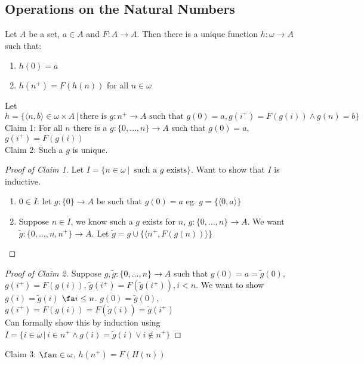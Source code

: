 
\subsection{Operations on the Natural Numbers}

\begin{theorem}
    Let $A$ be a set, $a \in A$ and $F : A \to A$. Then there is a unique function $h: \omega \to A$ such that: 
    \begin{enumerate}
        \item $h(0)=a$ 
        \item $h(n^+) = F(h(n))$ for all $n \in \omega$
    \end{enumerate}
\end{theorem}

\begin{pf}
    Let $h = \{ \langle n, b \rangle \in \omega \times A \, | \, \text{there is } g: n^+ \to A \text{ such that } g(0)=a, g(i^+)=F(g(i)) \wedge g(n)=b\}$ \\
    Claim 1: For all $n$ there is a $g : \{0, \ldots, n\} \to A$ such that $g(0)=a$, $g(i^+)=F(g(i))$ \\
    Claim 2: Such a $g$ is unique. 

\begin{proof}[Proof of Claim 1]
    Let $I = \{ n \in \omega \, | \, \text{ such a } g \text{ exists}\}$. Want to show that $I$ is inductive. 
    \begin{enumerate}
        \item $0 \in I$: let $g: \{0\} \to A$ be such that $g(0)=a$ eg. $g = \{ \langle 0, a \rangle \}$ 
        \item Suppose $n \in I$, we know such a $g$ exists for $n$, $g: \{0, \ldots, n\} \to A$. We want $\tilde{g}: \{0, \ldots, n, n^+\} \to A$. Let $\tilde{g} = g \cup \{ \langle n^+, F(g(n)) \rangle \}$ 
    \end{enumerate}
\end{proof}

\begin{proof}[Proof of Claim 2]
    Suppose $g, \tilde{g}: \{0, \ldots, n\} \to A$ such that $g(0) = a = \tilde{g}(0)$, $g(i^+) = F(g(i))$, $\tilde{g}(i^+) = F(\tilde{g}(i^+)), i < n$. We want to show $g(i) = \tilde{g}(i)$ $\fa i \le n$. $g(0) = \tilde{g}(0)$, $g(i^+) = F(g(i)) = F(\tilde{g}(i)) = \tilde{g}(i^+)$ \\
    Can formally show this by induction using $I = \{ i \in \omega \, | \, i \in n^+ \wedge g(i) = \tilde{g}(i) \vee i \not\in n^+\}$
\end{proof}

\noindent
Claim 3: $\fa n \in \omega$, $h(n^+) = F(H(n))$ 

\end{pf} 

